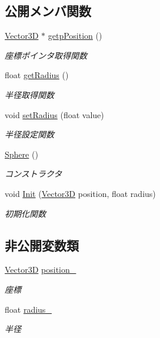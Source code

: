 \subsection*{公開メンバ関数}
\begin{DoxyCompactItemize}
\item 
\mbox{\hyperlink{class_vector3_d}{Vector3D}} $\ast$ \mbox{\hyperlink{class_sphere_ad1885bd0628ecd509ea2a61918875bd1}{getp\+Position}} ()
\begin{DoxyCompactList}\small\item\em 座標ポインタ取得関数 \end{DoxyCompactList}\item 
float \mbox{\hyperlink{class_sphere_a330dd34c7c7b6dfff106c4c71ec80028}{get\+Radius}} ()
\begin{DoxyCompactList}\small\item\em 半径取得関数 \end{DoxyCompactList}\item 
void \mbox{\hyperlink{class_sphere_ad813f5d3e9da96cf1111aedec4ec9b5f}{set\+Radius}} (float value)
\begin{DoxyCompactList}\small\item\em 半径設定関数 \end{DoxyCompactList}\item 
\mbox{\hyperlink{class_sphere_a890a63ff583cb88e7ec4e840b4ef5eb9}{Sphere}} ()
\begin{DoxyCompactList}\small\item\em コンストラクタ \end{DoxyCompactList}\item 
void \mbox{\hyperlink{class_sphere_aa0c93894c5dad170bd65f1cec3493c37}{Init}} (\mbox{\hyperlink{class_vector3_d}{Vector3D}} position, float radius)
\begin{DoxyCompactList}\small\item\em 初期化関数 \end{DoxyCompactList}\end{DoxyCompactItemize}
\subsection*{非公開変数類}
\begin{DoxyCompactItemize}
\item 
\mbox{\hyperlink{class_vector3_d}{Vector3D}} \mbox{\hyperlink{class_sphere_a5a18bfcc7abcdfbd6802ec622dfa5590}{position\+\_\+}}
\begin{DoxyCompactList}\small\item\em 座標 \end{DoxyCompactList}\item 
float \mbox{\hyperlink{class_sphere_ac2924d9ad22bfad1ed1914c069c188dc}{radius\+\_\+}}
\begin{DoxyCompactList}\small\item\em 半径 \end{DoxyCompactList}\end{DoxyCompactItemize}
